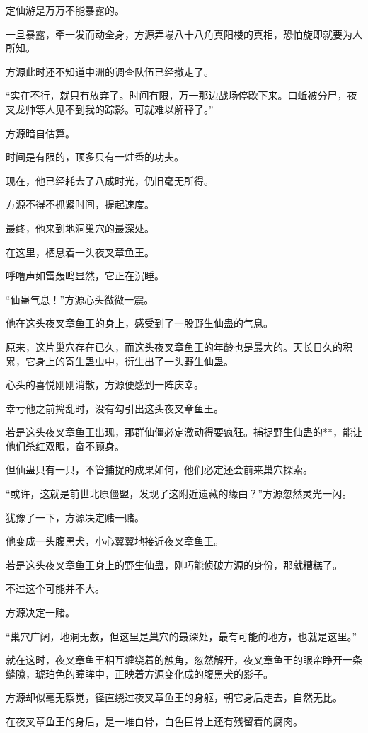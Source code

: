 \begin{this_body}
定仙游是万万不能暴露的。

一旦暴露，牵一发而动全身，方源弄塌八十八角真阳楼的真相，恐怕旋即就要为人所知。

方源此时还不知道中洲的调查队伍已经撤走了。

“实在不行，就只有放弃了。时间有限，万一那边战场停歇下来。口蚯被分尸，夜叉龙帅等人见不到我的踪影。可就难以解释了。”

方源暗自估算。

时间是有限的，顶多只有一炷香的功夫。

现在，他已经耗去了八成时光，仍旧毫无所得。

方源不得不抓紧时间，提起速度。

最终，他来到地洞巢穴的最深处。

在这里，栖息着一头夜叉章鱼王。

呼噜声如雷轰鸣显然，它正在沉睡。

“仙蛊气息！”方源心头微微一震。

他在这头夜叉章鱼王的身上，感受到了一股野生仙蛊的气息。

原来，这片巢穴存在已久，而这头夜叉章鱼王的年龄也是最大的。天长日久的积累，它身上的寄生蛊虫中，衍生出了一头野生仙蛊。

心头的喜悦刚刚消散，方源便感到一阵庆幸。

幸亏他之前捣乱时，没有勾引出这头夜叉章鱼王。

若是这头夜叉章鱼王出现，那群仙僵必定激动得要疯狂。捕捉野生仙蛊的**，能让他们杀红双眼，奋不顾身。

但仙蛊只有一只，不管捕捉的成果如何，他们必定还会前来巢穴探索。

“或许，这就是前世北原僵盟，发现了这附近遗藏的缘由？”方源忽然灵光一闪。

犹豫了一下，方源决定赌一赌。

他变成一头腹黑犬，小心翼翼地接近夜叉章鱼王。

若是这头夜叉章鱼王身上的野生仙蛊，刚巧能侦破方源的身份，那就糟糕了。

不过这个可能并不大。

方源决定一赌。

“巢穴广阔，地洞无数，但这里是巢穴的最深处，最有可能的地方，也就是这里。”

就在这时，夜叉章鱼王相互缠绕着的触角，忽然解开，夜叉章鱼王的眼帘睁开一条缝隙，琥珀色的瞳眸中，正映着方源变化成的腹黑犬的影子。

方源却似毫无察觉，径直绕过夜叉章鱼王的身躯，朝它身后走去，自然无比。

在夜叉章鱼王的身后，是一堆白骨，白色巨骨上还有残留着的腐肉。


\end{this_body}
